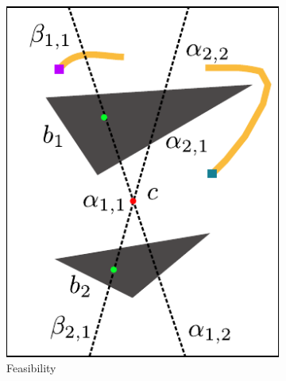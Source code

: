 \documentclass[letterpaper, 10 pt, conference]{ieeeconf}
\begin{document}
\begin{figure}
	\centering
	\begin{subfigure}[t]{0.45\linewidth}
		\centering
		\includegraphics[width=\textwidth]{fig/feasibility}
		\caption{Feasibility}
		\label{fig:grammar:feasibility}
	\end{subfigure}  
	\begin{subfigure}[t]{0.45\linewidth}
		\centering

\end{subfigure}
\end{figure}
\end{document}
